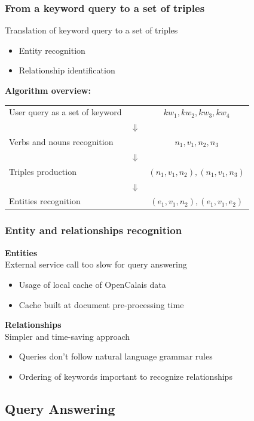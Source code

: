 \documentclass{beamer}
\begin{document}
\begin{frame}
\frametitle{From a keyword query to a set of triples}
Translation of keyword query to a set of triples
\begin{itemize}
\item Entity recognition
\item Relationship identification
\end{itemize}
\vspace{5mm}
{\color{red}\bfseries{Algorithm overview:}}\\
\vspace{3mm}
\begin{tabular}{lcc}
User query as a set of keyword && $kw_{1}, kw_{2}, kw_{3}, kw_{4}$\\
& $\Downarrow$ &\\
Verbs and nouns recognition && $n_{1}, v_{1}, n_{2}, n_{3}$\\
& $\Downarrow$ &\\
Triples production && $(n_{1}, v_{1}, n_{2}), (n_{1}, v_{1}, n_{3})$\\
& $\Downarrow$ &\\
Entities recognition && $(e_{1}, v_{1}, n_{2}), (e_{1}, v_{1}, e_{2})$\\
\end{tabular}
\end{frame}

\begin{frame}
\frametitle{Entity and relationships recognition}
{\color{red}\bfseries{Entities}}\\
\smallskip
External service call too slow for query answering
\begin{itemize}
\item Usage of local cache of OpenCalais data
\item Cache built at document pre-processing time
\end{itemize}
\bigskip
{\color{red}\bfseries{Relationships}}\\
\smallskip
Simpler and time-saving approach
\begin{itemize}
\item Queries don't follow natural language grammar rules
\item Ordering of keywords important to recognize relationships
\end{itemize}
\end{frame}

\subsection{Query Answering}
\end{document}
